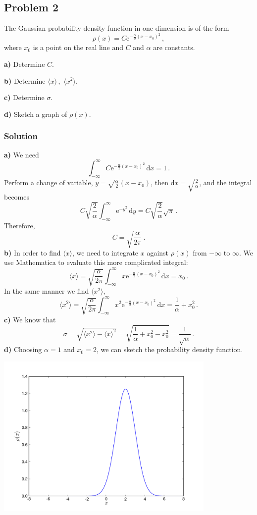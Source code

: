 \documentclass[letterpaper,10pt]{article}
\def\d{\mathrm{d}}
\def\e{\mathrm{e}}
\begin{document}
\subsection*{Problem 2}
The Gaussian probability density function in one dimension is of the form
\[
\rho(x)=C\e^{-\frac{\alpha}{2}(x-x_0)^2}\,,
\]
where $x_0$ is a point on the real line and $C$ and $\alpha$ are constants.

\textbf{a)} Determine $C$.

\textbf{b)} Determine $\langle x\rangle\,,\,\,\langle x^2\rangle$.

\textbf{c)} Determine $\sigma$.

\textbf{d)} Sketch a graph of $\rho(x)$.

\subsubsection*{Solution}
\textbf{a)} We need
\[
\int_{-\infty}^\infty C\e^{-\frac{\alpha}{2}(x-x_0)^2}\,\d x=1\,.
\]
Perform a change of variable, $y=\sqrt{\frac{\alpha}{2}}(x-x_0)$, then $\d
x=\sqrt{\frac{2}{\alpha}}$, and the integral becomes
\[
C\sqrt{\frac{2}{\alpha}}\int_{-\infty}^\infty \e^{-y^2}\,\d y
=C\sqrt{\frac{2}{\alpha}}\sqrt{\pi}\,.
\]
Therefore,
\[
C=\sqrt{\frac{\alpha}{2\pi}}\,.
\]
\textbf{b)}
In order to find $\langle x\rangle$, we need to integrate $x$ against $\rho(x)$
from $-\infty$ to $\infty$. We use Mathematica to evaluate this more
complicated integral:
\[
\langle x\rangle=
\sqrt{\frac{\alpha}{2\pi}}\int_{-\infty}^\infty x\e^{-\frac{\alpha}{2}(x-x_0)^2}
\,\d x=x_0\,.
\]
In the same manner we find $\langle x^2\rangle$,
\[
\langle x^2\rangle=
\sqrt{\frac{\alpha}{2\pi}}\int_{-\infty}^\infty
x^2\e^{-\frac{\alpha}{2}(x-x_0)^2}
\,\d x=\frac{1}{\alpha}+x_0^2\,.
\]
\textbf{c)}
We know that
\[
\sigma=\sqrt{\langle x^2\rangle-\langle x\rangle^2}
=\sqrt{\frac{1}{\alpha}+x_0^2-x_0^2}=\frac{1}{\sqrt{\alpha}}\,.
\]
\textbf{d)} Choosing $\alpha=1$ and $x_0=2$, we can sketch the probability
density function.
\begin{center}
\includegraphics[width=0.8\textwidth]{Prob2.pdf}
\end{center}
\end{document}
